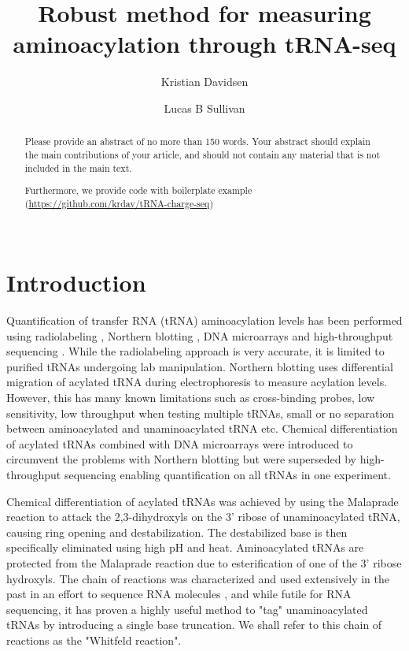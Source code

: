 \documentclass[9pt,lineno]{elife}
\title{Robust method for measuring aminoacylation through tRNA-seq}
\author[1,2]{Kristian Davidsen}
\author[1*]{Lucas B Sullivan}
\affil[1]{Fred Hutchinson Cancer Center}
\affil[2]{Molecular and cellular biology program, University of Washington}
\begin{document}
\maketitle

\begin{abstract}
Please provide an abstract of no more than 150 words. Your abstract should explain the main contributions of your article, and should not contain any material that is not included in the main text.

Furthermore, we provide code with boilerplate example (\url{https://github.com/krdav/tRNA-charge-seq}) \\ \ \\
\end{abstract}


\section{Introduction}
Quantification of transfer RNA (tRNA) aminoacylation levels has been performed using radiolabeling \citep{Wolfson2002-gp}, Northern blotting \citep{Ho1987-ug, Varshney1991-zp, Stenum2017-wn}, DNA microarrays \citep{Dittmar2005-va} and high-throughput sequencing \citep{Evans2017-st}.
While the radiolabeling approach is very accurate, it is limited to purified tRNAs undergoing lab manipulation.
Northern blotting uses differential migration of acylated tRNA during electrophoresis to measure acylation levels.
However, this has many known limitations such as cross-binding probes, low sensitivity, low throughput when testing multiple tRNAs, small or no separation between aminoacylated and unaminoacylated tRNA etc.
Chemical differentiation of acylated tRNAs combined with DNA microarrays were introduced to circumvent the problems with Northern blotting but were superseded by high-throughput sequencing enabling quantification on all tRNAs in one experiment.

Chemical differentiation of acylated tRNAs was achieved by using the Malaprade reaction to attack the 2,3-dihydroxyls on the 3' ribose of unaminoacylated tRNA, causing ring opening and destabilization.
The destabilized base is then specifically eliminated using high pH and heat.
Aminoacylated tRNAs are protected from the Malaprade reaction due to esterification of one of the 3' ribose hydroxyls.
The chain of reactions was characterized and used extensively in the past in an effort to sequence RNA molecules \citep{Whitfeld1953-ca, Whitfeld1954-wl, Khym1961-xf, Neu1964-hu}, and while futile for RNA sequencing, it has proven a highly useful method to "tag" unaminoacylated tRNAs by introducing a single base truncation.
We shall refer to this chain of reactions as the "Whitfeld reaction".
\end{document}
